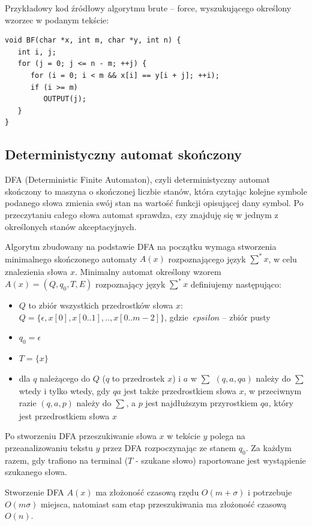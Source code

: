 \documentclass[a4paper,12pt]{article}
\begin{document}
Przykładowy kod źródłowy algorytmu brute -- force, wyszukującego określony wzorzec w podanym tekście:
\begin{lstlisting}
void BF(char *x, int m, char *y, int n) {
   int i, j;
   for (j = 0; j <= n - m; ++j) {
      for (i = 0; i < m && x[i] == y[i + j]; ++i);
      if (i >= m)
         OUTPUT(j);
   }
}
\end{lstlisting}

\subsection{Deterministyczny automat skończony}

DFA (Deterministic Finite Automaton), czyli deterministyczny automat skończony to maszyna o skończonej liczbie stanów, która czytając kolejne symbole podanego słowa zmienia swój stan na wartość funkcji opisującej dany symbol. Po przeczytaniu całego słowa automat sprawdza, czy znajduję się w jednym z określonych stanów akceptacyjnych.

Algorytm zbudowany na podstawie DFA na początku wymaga stworzenia minimalnego skończonego automaty $A(x)$ rozpoznającego język $\sum_{}^*x$, w celu znalezienia słowa $x$. Minimalny automat określony wzorem $A(x)=(Q, q_0, T, E)$ rozpoznający język $\sum_{}^*x$ definiujemy następująco:
\begin{itemize}
\item $Q$ to zbiór wszystkich przedrostków słowa $x$: \\
$Q = \{ \epsilon , x[0], x[0..1], .. , x[0..m-2] \} $, gdzie $ \ epsilon $ -- zbiór pusty
\item $q_0 = \epsilon $
\item $T = \{ x \} $
\item dla $q$ należącego do $Q$ ($q$ to przedrostek $x$) i $a$ w $\sum_{}$ $(q, a, qa)$ należy do $\sum_{}$ wtedy i tylko wtedy, gdy $qa$ jest także przedrostkiem słowa $x$, w przeciwnym razie $(q, a, p)$ należy do $\sum_{}$, a $p$ jest najdłuższym przyrostkiem $qa$, który jest przedrostkiem słowa $x$
\end{itemize}

Po stworzeniu DFA przeszukiwanie słowa $x$ w tekście $y$ polega na przeanalizowaniu tekstu $y$ przez DFA rozpoczynając ze stanem $q_0$. Za każdym razem, gdy trafiono na terminal ($T$ - szukane słowo) raportowane jest wystąpienie szukanego słowa.

Stworzenie DFA $A(x)$ ma złożoność czasową rzędu $O(m+\sigma)$ i potrzebuje $O(m\sigma)$ miejsca, natomiast sam etap przeszukiwania ma złożoność czasową $O(n)$.
\end{document}
